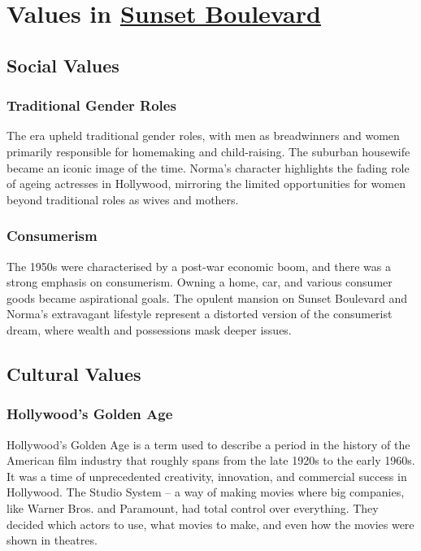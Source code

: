 \documentclass[a4paper]{article}
\begin{document}
\section{Values in \underline{Sunset Boulevard}}

\subsection{Social Values}
\subsubsection{Traditional Gender Roles}
The era upheld traditional gender roles, with men as breadwinners and women primarily responsible for homemaking and child-raising. The suburban housewife became an iconic image of the time. Norma’s character highlights the fading role of ageing actresses in Hollywood, mirroring the limited opportunities for women beyond traditional roles as wives and mothers.\\

\subsubsection{Consumerism}
The 1950s were characterised by a post-war economic boom, and there was a strong emphasis on consumerism. Owning a home, car, and various consumer goods became aspirational goals. The opulent mansion on Sunset Boulevard and Norma’s extravagant lifestyle represent a distorted version of the consumerist dream, where wealth and possessions mask deeper issues.\\

\subsection{Cultural Values}
\subsubsection{Hollywood's Golden Age}
Hollywood’s Golden Age is a term used to describe a period in the history of the American film industry that roughly spans from the late 1920s to the early 1960s. It was a time of unprecedented creativity, innovation, and commercial success in Hollywood.
The Studio System – a way of making movies where big companies, like Warner Bros. and Paramount, had total control over everything. They decided which actors to use, what movies to make, and even how the movies were shown in theatres.\\
\end{document}
